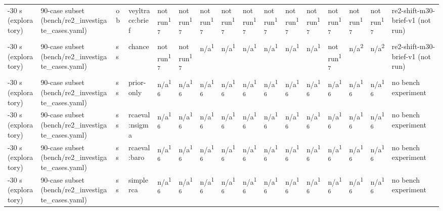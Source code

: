 \begin{table}[t]
\begin{tabular}{llllllllllllllll}
-30 s (exploratory) & 90-case subset (bench/re2\_investigate\_cases.yaml) & ob & veyltrace:brief & not run\textsuperscript{17} & not run\textsuperscript{17} & not run\textsuperscript{17} & not run\textsuperscript{17} & not run\textsuperscript{17} & not run\textsuperscript{17} & not run\textsuperscript{17} & not run\textsuperscript{17} & not run\textsuperscript{17} & not run\textsuperscript{17} & not run\textsuperscript{17} & re2-shift-m30-brief-v1 (not run) \\
-30 s (exploratory) & 90-case subset (bench/re2\_investigate\_cases.yaml) & ss & chance & not run\textsuperscript{17} & not run\textsuperscript{17} & n/a\textsuperscript{1} & n/a\textsuperscript{1} & n/a\textsuperscript{1} & n/a\textsuperscript{1} & n/a\textsuperscript{1} & n/a\textsuperscript{1} & not run\textsuperscript{17} & n/a\textsuperscript{2} & n/a\textsuperscript{2} & re2-shift-m30-brief-v1 (not run) \\
-30 s (exploratory) & 90-case subset (bench/re2\_investigate\_cases.yaml) & ss & prior-only & n/a\textsuperscript{16} & n/a\textsuperscript{16} & n/a\textsuperscript{16} & n/a\textsuperscript{16} & n/a\textsuperscript{16} & n/a\textsuperscript{16} & n/a\textsuperscript{16} & n/a\textsuperscript{16} & n/a\textsuperscript{16} & n/a\textsuperscript{16} & n/a\textsuperscript{16} & no bench experiment \\
-30 s (exploratory) & 90-case subset (bench/re2\_investigate\_cases.yaml) & ss & rcaeval:nsigma & n/a\textsuperscript{16} & n/a\textsuperscript{16} & n/a\textsuperscript{16} & n/a\textsuperscript{16} & n/a\textsuperscript{16} & n/a\textsuperscript{16} & n/a\textsuperscript{16} & n/a\textsuperscript{16} & n/a\textsuperscript{16} & n/a\textsuperscript{16} & n/a\textsuperscript{16} & no bench experiment \\
-30 s (exploratory) & 90-case subset (bench/re2\_investigate\_cases.yaml) & ss & rcaeval:baro & n/a\textsuperscript{16} & n/a\textsuperscript{16} & n/a\textsuperscript{16} & n/a\textsuperscript{16} & n/a\textsuperscript{16} & n/a\textsuperscript{16} & n/a\textsuperscript{16} & n/a\textsuperscript{16} & n/a\textsuperscript{16} & n/a\textsuperscript{16} & n/a\textsuperscript{16} & no bench experiment \\
-30 s (exploratory) & 90-case subset (bench/re2\_investigate\_cases.yaml) & ss & simplerca & n/a\textsuperscript{16} & n/a\textsuperscript{16} & n/a\textsuperscript{16} & n/a\textsuperscript{16} & n/a\textsuperscript{16} & n/a\textsuperscript{16} & n/a\textsuperscript{16} & n/a\textsuperscript{16} & n/a\textsuperscript{16} & n/a\textsuperscript{16} & n/a\textsuperscript{16} & no bench experiment \\

\end{tabular}
\end{table}
